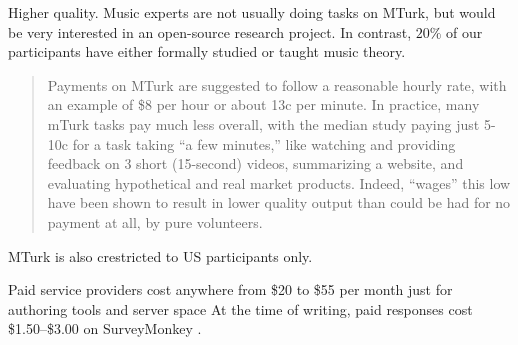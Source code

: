 
Higher quality. Music experts are not usually doing tasks on MTurk, but would
be very interested in an open-source research project. In contrast, $20\%$
 of our participants have either formally studied
or taught music theory.

\begin{quote}
Payments on MTurk are suggested to follow a reasonable hourly rate, with an
example of \$8 per hour or about 13c per minute. In practice, many mTurk
tasks pay much less overall, with the median study paying just 5-10c for a task
taking ``a few minutes,'' like watching and providing feedback on 3 short
(15-second) videos, summarizing a website, and evaluating hypothetical and real
market products. Indeed, ``wages'' this low have been shown to result in lower
quality output than could be had for no payment at all, by pure volunteers.
\end{quote}
\citep{downs2010your}

MTurk is also crestricted to US participants only\cite{quick2014kulitta}.

Paid service providers cost anywhere from \$20 to \$55 per month
just for authoring tools and server space\citep{JCC4:JCC411} At the time of writing,
paid responses cost \$1.50--\$3.00 on SurveyMonkey \citep{uksurveymonkey}.
